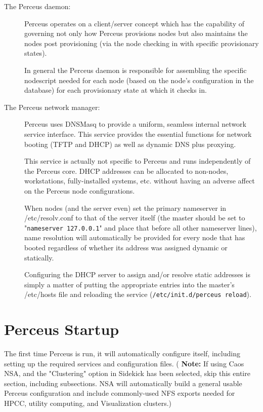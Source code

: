 \documentclass[10pt,letterpaper]{report}
\begin{document}
\begin{description}

\item[The Perceus daemon:] Perceus operates on a client/server concept which
has the capability of governing not only how Perceus provisions nodes but
also maintains the nodes post provisioning (via the node checking in with
specific provisionary states).

In general the Perceus daemon is responsible for assembling the specific
nodescript needed for each node (based on the node's configuration in the
database) for each provisionary state at which it checks in.

\item[The Perceus network manager:] Perceus uses DNSMasq to provide a uniform,
seamless internal network service interface. This service provides the
essential functions for network booting (TFTP and DHCP) as well as dynamic DNS
plus proxying.

This service is actually not specific to Perceus and runs independently of the
Perceus core.  DHCP addresses can be allocated to non-nodes, workstations,
fully-installed systems, etc. without having an adverse affect on the Perceus
node configurations.

When nodes (and the server even) set the primary nameserver in
/etc/resolv.conf to that of the server itself (the master should be set to
"{\tt nameserver 127.0.0.1}" and place that before all other nameserver
lines), name resolution will automatically be provided for every node that has
booted regardless of whether its address was assigned dynamic or statically.

Configuring the DHCP server to assign and/or resolve static addresses is
simply a matter of putting the appropriate entries into the master's
/etc/hosts file and reloading the service ({\tt /etc/init.d/perceus reload}).


\end{description}

\section{Perceus Startup}

The first time Perceus is run, it will automatically configure itself,
including setting up the required services and configuration files.  ({\bf
Note:} If using Caos NSA, and the "Clustering" option in Sidekick has been
selected, skip this entire section, including subsections.  NSA will
automatically build a general usable Perceus configuration and include
commonly-used NFS exports needed for HPCC, utility computing, and
Visualization clusters.)
\end{document}
